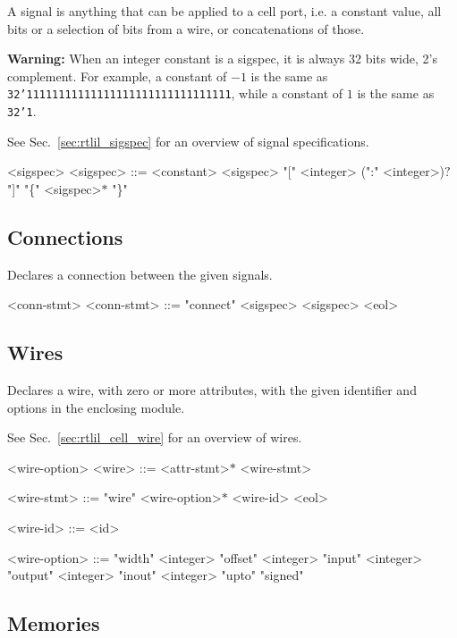 A signal is anything that can be applied to a cell port, i.e. a constant value, all bits or a selection of bits from a wire, or concatenations of those.

\textbf{Warning:} When an integer constant is a sigspec, it is always 32 bits wide, 2's complement. For example, a constant of $-1$ is the same as \texttt{32'11111111111111111111111111111111}, while a constant of $1$ is the same as \texttt{32'1}.

See Sec.~\ref{sec:rtlil_sigspec} for an overview of signal specifications.

\begin{indentgrammar}{<sigspec>}
<sigspec> ::=
<constant>
    \alt <sigspec> "[" <integer> (":" <integer>)$?$ "]"
    \alt "\{" <sigspec>$*$ "\}"
\end{indentgrammar}

\subsection{Connections}

Declares a connection between the given signals.

\begin{indentgrammar}{<conn-stmt>}
<conn-stmt> ::= "connect" <sigspec> <sigspec> <eol>
\end{indentgrammar}

\subsection{Wires}

Declares a wire, with zero or more attributes, with the given identifier and options in the enclosing module.

See Sec.~\ref{sec:rtlil_cell_wire} for an overview of wires.

\begin{indentgrammar}{<wire-option>}
<wire> ::= <attr-stmt>$*$ <wire-stmt>

<wire-stmt> ::= "wire" <wire-option>$*$ <wire-id> <eol>

<wire-id> ::= <id>

<wire-option> ::= 
"width" <integer>
  \alt "offset" <integer>
  \alt "input" <integer>
  \alt "output" <integer>
  \alt "inout" <integer>
  \alt "upto"
  \alt "signed"
\end{indentgrammar}

\subsection{Memories}


